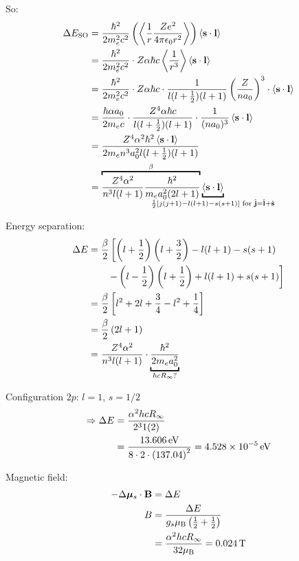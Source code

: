 \begin{parts}
	So:
	\begin{align*}
		\Delta E_\textnormal{SO} &= \frac{\hbar^2}{2m_e^2c^2} \rbracket{\avg{\frac{1}{r} \frac{Ze^2}{4\pi\permittivity r^2}}} \avg{\mathbf{s}\cdot\mathbf{l}} \\
		&= \frac{\hbar^2}{2m_e^2c^2} \cdot Z\alpha\hbar c \avg{\frac{1}{r^3}} \avg{\mathbf{s}\cdot\mathbf{l}} \\
		&= \frac{\hbar^2}{2m_e^2c^2} \cdot Z\alpha\hbar c \cdot \frac{1}{l(l+\frac{1}{2})(l+1)} \rbracket{\frac{Z}{na_0}}^3 \cdot \avg{\mathbf{s}\cdot\mathbf{l}} \\
		&= \frac{\hbar\alpha a_0}{2m_ec} \cdot \frac{Z^4\alpha\hbar c}{l(l+\frac{1}{2})(l+1)} \cdot \frac{1}{(na_0)^3} \avg{\mathbf{s}\cdot\mathbf{l}} \\
		&= \frac{Z^4\alpha^2\hbar^2\avg{\mathbf{s}\cdot\mathbf{l}}}{2m_en^3a_0^2l(l+\frac{1}{2})(l+1)} \\
		&= \overbracket{\frac{Z^4\alpha^2}{n^3l(l+1)} \frac{\hbar^2}{m_ea_0^2(2l+1)}}^{\beta} \underbracket{\avg{\mathbf{s}\cdot\mathbf{l}}}_{\mathclap{\frac{1}{2}[j(j+1)-l(l+1)-s(s+1)] \textnormal{ for } \hat{\mathbf{j}}=\hat{\mathbf{l}}+\hat{\mathbf{s}}}}
	\end{align*}
	
	Energy separation:
	\begin{align*}
		\Delta E &= \frac{\beta}{2} \sbracket{\rbracket{l+\frac{1}{2}}\rbracket{l+\frac{3}{2}} - l(l+1) - s(s+1) \right. \\
		&\left. \qquad - \rbracket{l-\frac{1}{2}}\rbracket{l+\frac{1}{2}} + l(l+1) + s(s+1)} \\
		&= \frac{\beta}{2} \sbracket{l^2 + 2l + \frac{3}{4} - l^2 + \frac{1}{4}} \\
		&= \frac{\beta}{2}\rbracket{2l+1} \\
		&= \frac{Z^4\alpha^2}{n^3l(l+1)} \cdot \underbracket{\frac{\hbar^2}{2m_ea_0^2}}_{hcR_\infty ?}
	\end{align*}
	
	Configuration $2p$: $l=1$, $s=1/2$
	\begin{align*}
		\Rightarrow\Delta E &= \frac{\alpha^2hcR_\infty}{2^3 1 (2)} \\
		&= \frac{\SI{13.606}{\electronvolt}}{8 \cdot 2 \cdot \left(\num{137.04}\right)^2} = \SI{4.528e-5}{\electronvolt}
	\end{align*}
	
	Magnetic field:
	\begin{align*}
		-\Delta\bm{\mu}_s \cdot \mathbf{B} &= \Delta E \\
		B &= \frac{\Delta E}{g_s \mu_\mathrm{B} \left(\frac{1}{2}+\frac{1}{2}\right)} \\
		&= \frac{\alpha^2hcR_\infty}{32\mu_\mathrm{B}} = \SI{0.024}{\tesla}
	\end{align*}
	

\end{parts}
